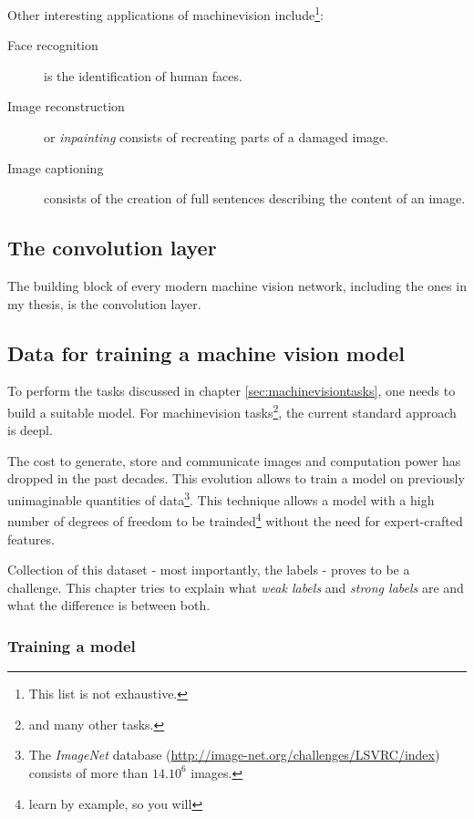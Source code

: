 Other interesting applications of \gls{machinevision} include\footnote{This list is not exhaustive.}:
\begin{description}
    \item[Face recognition] is the identification of human faces. 
    \item[Image reconstruction] or \textit{inpainting} consists of recreating parts of a damaged image.
    \item[Image captioning] consists of the creation of full sentences describing the content of an image.    
\end{description}

\subsection{The convolution layer}

The building block of every modern machine vision network, including the ones in my thesis, is the convolution layer.


\subsection{Data for training a machine vision model}

To perform the tasks discussed in chapter \ref{sec:machinevisiontasks}, one needs to build a suitable model.
For \Gls{machinevision} tasks\footnote{and many other tasks.}, the current standard approach is \Gls{deepl}.


The cost to generate, store and communicate images and computation power has dropped in the past decades.
This evolution allows to train a model  on previously unimaginable quantities of data\footnote{The \textit{ImageNet} database (\url{http://image-net.org/challenges/LSVRC/index}) consists of more than $14.10^6$ images.}.
This technique allows a model with a high number of degrees of freedom to be trainded\footnote{learn by example, so you will} without the need for expert-crafted features. 


Collection of this dataset - most importantly, the labels - proves to be a challenge. 
This chapter tries to explain what \textit{weak labels} and \textit{strong labels} are and what the difference is between both.

\subsubsection{Training a model}

